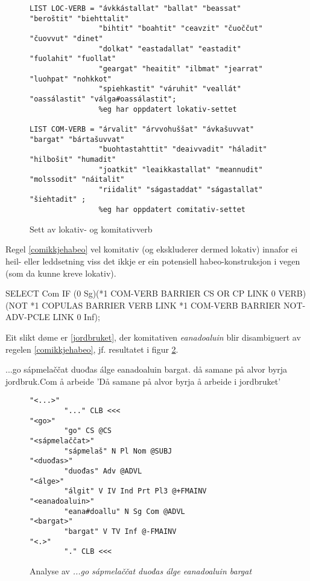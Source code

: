 \documentclass[a4paper,nynorsk]{article}
\begin{document}
\begin{figure}[htbp]
\begin{center}
\begin{verbatim}
LIST LOC-VERB = "ávkkástallat" "ballat" "beassat" "beroštit" "biehttalit"
			 	"bihtit" "boahtit" "ceavzit" "čuoččut" "čuovvut" "dinet" 
			 	"dolkat" "eastadallat" "eastadit" "fuolahit" "fuollat" 
			 	"geargat" "heaitit" "ilbmat" "jearrat" "luohpat" "nohkkot"
			 	"spiehkastit" "váruhit" "veallát" "oassálastit" "válga#oassálastit";
			 	%eg har oppdatert lokativ-settet

LIST COM-VERB = "árvalit" "árvvohuššat" "ávkašuvvat" "bargat" "bártašuvvat"
 				"buohtastahttit" "deaivvadit" "háladit" "hilbošit" "humadit"
 				"joatkit" "leaikkastallat" "meannudit" "molssodit" "náitalit"
 				"riidalit" "ságastaddat" "ságastallat" "šiehtadit" ;
 				%eg har oppdatert comitativ-settet
\end{verbatim}
\caption{Sett av lokativ- og komitativverb}
\label{loccomverb}
\end{center}
\end{figure}

Regel \ref{comikkjehabeo} vel komitativ (og ekskluderer dermed lokativ) innafor ei heil- eller leddsetning viss det ikkje er ein potensiell habeo-konstruksjon i vegen (som da kunne kreve lokativ). %

\begin{example}\label{comikkjehabeo}
SELECT Com IF (0 Sg)(*1 COM-VERB BARRIER CS OR CP LINK 0 VERB)
	(NOT *1 COPULAS BARRIER VERB LINK *1 COM-VERB BARRIER NOT-ADV-PCLE 
	LINK 0 Inf);    
\end{example}

Eit slikt døme er \ref{jordbruket}, der komitativen \emph{eanadoaluin} blir disambiguert av regelen \ref{comikkjehabeo}, jf. resultatet i figur \ref{comverbana}.%

\begin{example}\label{jordbruket}
\gll ...go sápmelaččat duođas álge eanadoaluin bargat.
     då samane {på alvor} byrja jordbruk.Com {å arbeide}
\glt 'Då samane på alvor byrja å arbeide i jordbruket'
\glend     
\end{example}

\begin{figure}[htbp]
\begin{center}
\begin{verbatim}
"<...>"
        "..." CLB <<<
"<go>"
        "go" CS @CS
"<sápmelaččat>"
        "sápmelaš" N Pl Nom @SUBJ
"<duođas>"
        "duođas" Adv @ADVL
"<álge>"
        "álgit" V IV Ind Prt Pl3 @+FMAINV
"<eanadoaluin>"
        "eana#doallu" N Sg Com @ADVL
"<bargat>"
        "bargat" V TV Inf @-FMAINV
"<.>"
        "." CLB <<<
\end{verbatim}
\caption{Analyse av \textit{...go sápmelaččat duođas álge eanadoaluin bargat}}
\label{comverbana}
\end{center}
\end{figure}
\end{document}
